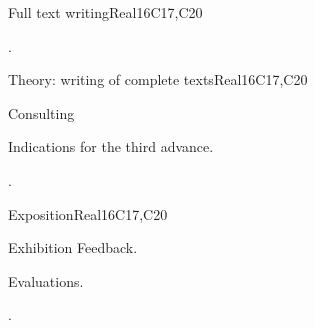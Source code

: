 \begin{syllabus}
\begin{unit}{Full text writing}{}{Real}{16}{C17,C20}
  \begin{learningoutcomes}
   \item .%
  \end{learningoutcomes}
\end{unit}

\begin{unit}{Theory: writing of complete texts}{}{Real}{16}{C17,C20}
  \begin{topics}
      \item Consulting
      \item Indications for the third advance.
  \end{topics}

  \begin{learningoutcomes}
   \item .%
  \end{learningoutcomes}
\end{unit}


\begin{unit}{Exposition}{}{Real}{16}{C17,C20}
  \begin{topics}
      \item Exhibition Feedback.
      \item Evaluations.
  \end{topics}

  \begin{learningoutcomes}
   \item .%
  \end{learningoutcomes}
\end{unit}


\begin{coursebibliography}
\end{coursebibliography}

\end{syllabus}
